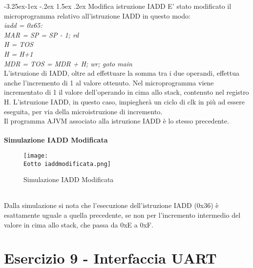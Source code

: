 \documentclass[12pt]{article}
\makeatletter
\renewcommand\subsubsection{\@startsection{subsubsection}{3}{\z@}%
            {-3.25ex\@plus -1ex \@minus -.2ex}%
            {1.5ex \@plus .2ex}%
            {\normalfont\large\bfseries}}
\def \Eotto {Allegati/Esercizio8/}
\makeatother
\begin{document}
\subsubsection{Modifica istruzione IADD}
E’ stato modificato il microprogramma relativo all’istruzione IADD in questo modo:
\textit{
    \\iadd = 0x65:
    \\\hspace*{2cm} MAR = SP = SP - 1; rd
    \\\hspace*{2cm} H = TOS
    \\\hspace*{2cm} H = H+1
    \\\hspace*{2cm} MDR = TOS = MDR + H; wr; goto main
}
\\L’istruzione di IADD, oltre ad effettuare la somma tra i due operandi, effettua anche l’incremento di 1 al valore ottenuto. Nel microprogramma viene incrementato di 1 il valore dell’operando in cima allo stack, contenuto nel registro H. L’istruzione IADD, in questo caso, impiegherà un ciclo di clk in più ad essere eseguita, per via della microistruzione di incremento.
\\Il programma AJVM associato alla istruzione IADD è lo stesso precedente.
\\\\{\large \textbf{Simulazione IADD Modificata}}
\begin{figure}[ht]
    \centering
    \texttt{[image: \\Eotto iaddmodificata.png]}
    \caption{Simulazione IADD Modificata}
\end{figure}
\\Dalla simulazione si nota che l’esecuzione dell’istruzione IADD (0x36) è esattamente uguale a quella precedente, se non per l’incremento intermedio del valore in cima allo stack, che passa da 0xE a 0xF.

\clearpage
\section{Esercizio 9 - Interfaccia UART}
\end{document}
